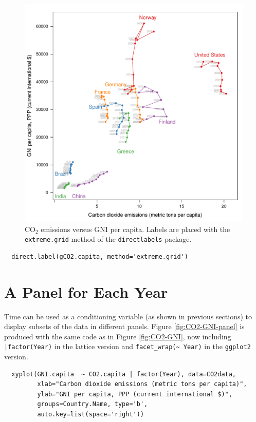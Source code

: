 \documentclass[smallroyalvopaper]{memoir}
\begin{document}
\begin{figure}[htbp]
\centering
\includegraphics[width=.9\linewidth]{figs/CO2_capitaDL.pdf}
\caption{\(\mathrm{CO_2}\) emissions versus GNI per capita. Labels are placed with the \texttt{extreme.grid} method of the \texttt{directlabels} package. \label{fig:CO2-GNI-DL}}
\end{figure}

\lstset{language=r,label= ,caption= ,captionpos=b,numbers=none}
\begin{lstlisting}
  direct.label(gCO2.capita, method='extreme.grid')
\end{lstlisting}

\section{A Panel for Each Year}
\label{sec:org485a375}
Time can be used as a conditioning variable (as shown in previous
sections) to display subsets of the data in different panels. Figure
\ref{fig:CO2-GNI-panel} is produced with the same code as in Figure
\ref{fig:CO2-GNI}, now including \texttt{|factor(Year)} in the lattice
version and \texttt{facet\_wrap(\textasciitilde{} Year)} in the \texttt{ggplot2} version.

\lstset{language=r,label= ,caption= ,captionpos=b,numbers=none}
\begin{lstlisting}
  xyplot(GNI.capita  ~ CO2.capita | factor(Year), data=CO2data,
         xlab="Carbon dioxide emissions (metric tons per capita)",
         ylab="GNI per capita, PPP (current international $)",
         groups=Country.Name, type='b',
         auto.key=list(space='right'))
\end{lstlisting}
\end{document}
